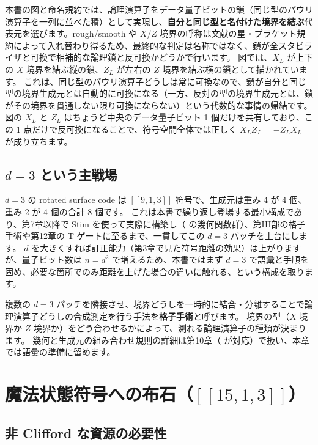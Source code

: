 本書の図と命名規約では、論理演算子をデータ量子ビットの鎖（同じ型のパウリ演算子を一列に並べた積）として実現し、\textbf{自分と同じ型と名付けた境界を結ぶ}代表元を選びます。rough/smooth や $X/Z$ 境界の呼称は文献の星・プラケット規約によって入れ替わり得るため、最終的な判定は名称ではなく、鎖が全スタビライザと可換で相補的な論理鎖と反可換かどうかで行います\cite{fowler2012surface}。
図では、$X_L$ が上下の $X$ 境界を結ぶ縦の鎖、$Z_L$ が左右の $Z$ 境界を結ぶ横の鎖として描かれています。
これは、同じ型のパウリ演算子どうしは常に可換なので、鎖が自分と同じ型の境界生成元とは自動的に可換になる（一方、反対の型の境界生成元とは、鎖がその境界を貫通しない限り可換にならない）という代数的な事情の帰結です。
図の $X_L$ と $Z_L$ はちょうど中央のデータ量子ビット 1 個だけを共有しており、この 1 点だけで反可換になることで、符号空間全体では正しく $X_LZ_L=-Z_LX_L$ が成り立ちます。

\subsection{$d=3$ という主戦場}

$d=3$ の rotated surface code は $[[9,1,3]]$ 符号で、生成元は重み 4 が 4 個、重み 2 が 4 個の合計 8 個です。
これは本書で繰り返し登場する最小構成であり、第7章以降で Stim を使って実際に構築し（ の幾何関数群）、第III部の格子手術や第12章の T ゲートに至るまで、一貫してこの $d=3$ パッチを土台にします。
$d$ を大きくすれば訂正能力（第3章で見た符号距離の効果）は上がりますが、量子ビット数は $n=d^2$ で増えるため、本書ではまず $d=3$ で語彙と手順を固め、必要な箇所でのみ距離を上げた場合の違いに触れる、という構成を取ります。

\begin{notebox}
  複数の $d=3$ パッチを隣接させ、境界どうしを一時的に結合・分離することで論理演算子どうしの合成測定を行う手法を\textbf{格子手術}と呼びます。
  境界の型（$X$ 境界か $Z$ 境界か）をどう合わせるかによって、測れる論理演算子の種類が決まります。
  幾何と生成元の組み合わせ規則の詳細は第10章（ が対応）で扱い、本章では語彙の準備に留めます。
\end{notebox}

\section{魔法状態符号への布石（\texorpdfstring{$[[15,1,3]]$}{[[15,1,3]]}）}\label{sec:rm15}

\subsection{非 Clifford な資源の必要性}

